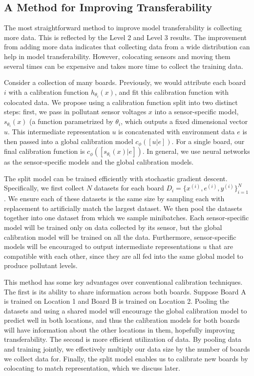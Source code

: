 \documentclass[journal abbreviation, manuscript]{copernicus}
\begin{document}
\subsection{A Method for Improving Transferability}

The most straightforward method to improve model transferability is collecting more data.
This is reflected by the Level 2 and Level 3 results. The improvement from adding more data indicates that collecting data from a wide distribution can help in model transferability.
However, colocating sensors and moving them
several times can be expensive and takes more time to collect the training data.

Consider a collection of many boards. Previously, we would attribute each board $i$ with a calibration function $h_{\theta_i}(x)$, and fit this calibration function with colocated data.
We propose using a calibration function split into two distinct steps: first, we pass in pollutant sensor voltages $x$ into a sensor-specific model, $s_{\theta_i}(x)$ (a function parametrized by $\theta_i$, which outputs a fixed dimensional vector $u$. This intermediate representation $u$ is concatenated with environment data $e$ is then passed into a global calibration model $c_\phi([u | e])$. For a single board, our final calibration function is $c_\phi([s_{\theta_i}(x) | e])$.
In general, we use neural networks as the sensor-specific models and the global calibration models.

The split model can be trained efficiently with stochastic gradient descent. Specifically, we first collect $N$ datasets for each board $D_i = \{x^{(i)}, e^{(i)}, y^{(i)}\}_{i = 1}^N$. We ensure each of these datasets is the same size by sampling each with replacement to artificially match the largest dataset. We then pool the datasets together into one dataset from which we sample minibatches. Each sensor-specific model will be trained only on data collected by its sensor, but the global calibration model will be trained on all the data. Furthermore, sensor-specific models will be encouraged to output intermediate representations $u$ that are compatible with each other, since they are all fed into the same global model to produce pollutant levels.

This method has some key advantages over conventional calibration techniques. 
The first is its ability to share information across both boards. 
Suppose Board A is trained on Location 1 and Board B is trained on Location 2. Pooling the datasets and using a shared model will encourage the global calibration model to predict well in both locations, and thus the calibration models for both boards will have information about the other locations in them, hopefully improving transferability.
The second is more efficient utilization of data. By pooling data and training jointly, we effectively multiply our data size by the number of boards we collect data for.
Finally, the split model enables us to calibrate new boards by colocating to match representation, which we discuss later.
\end{document}
